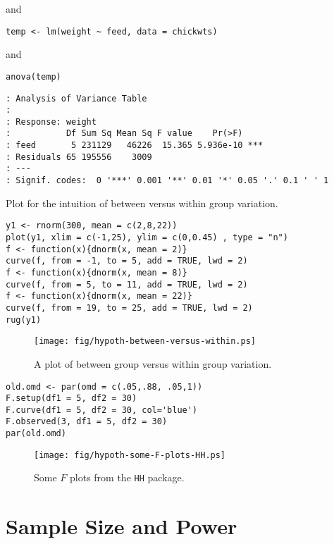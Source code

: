 and
\begin{verbatim}
temp <- lm(weight ~ feed, data = chickwts)
\end{verbatim}
and 
\begin{verbatim}
anova(temp)
\end{verbatim}

\begin{verbatim}
: Analysis of Variance Table
: 
: Response: weight
:           Df Sum Sq Mean Sq F value    Pr(>F)    
: feed       5 231129   46226  15.365 5.936e-10 ***
: Residuals 65 195556    3009                      
: ---
: Signif. codes:  0 '***' 0.001 '**' 0.01 '*' 0.05 '.' 0.1 ' ' 1
\end{verbatim}

Plot for the intuition of between versus within group variation.

\begin{verbatim}
y1 <- rnorm(300, mean = c(2,8,22))
plot(y1, xlim = c(-1,25), ylim = c(0,0.45) , type = "n")
f <- function(x){dnorm(x, mean = 2)}
curve(f, from = -1, to = 5, add = TRUE, lwd = 2)
f <- function(x){dnorm(x, mean = 8)}
curve(f, from = 5, to = 11, add = TRUE, lwd = 2)
f <- function(x){dnorm(x, mean = 22)}
curve(f, from = 19, to = 25, add = TRUE, lwd = 2)
rug(y1)
\end{verbatim}

\begin{figure}[ht!]
\centering
\texttt{[image: fig/hypoth-between-versus-within.ps]}
\caption[Between group versus within group variation]{\label{fig-between-versus-within}\small A plot of between group versus within group variation.}
\end{figure}


\begin{verbatim}
old.omd <- par(omd = c(.05,.88, .05,1))
F.setup(df1 = 5, df2 = 30)
F.curve(df1 = 5, df2 = 30, col='blue')
F.observed(3, df1 = 5, df2 = 30)
par(old.omd)
\end{verbatim}

\begin{figure}[ht!]
\centering
\texttt{[image: fig/hypoth-some-F-plots-HH.ps]}
\caption[Some \(F\) plots from the \texttt{HH} package]{\label{fig-some-F-plots-HH}\small Some \(F\) plots from the \texttt{HH} package.}
\end{figure}

\section{Sample Size and Power}
\label{sec-10-7}

